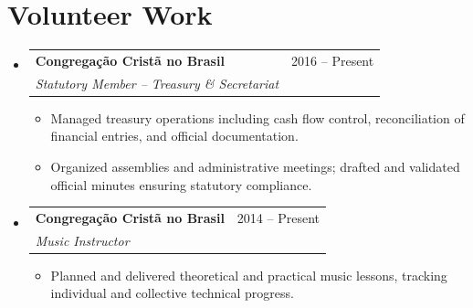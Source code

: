 \documentclass[letterpaper,11pt]{article}
\makeatletter
\newcommand{\resumeItem}[1]{
    \item\small{
            {#1 \vspace{-2pt}}
    }
}
\newcommand{\resumeSubheading}[4]{
    \vspace{-2pt}\item
    \begin{tabular*}{0.97\textwidth}[t]{l@{\extracolsep{\fill}}r}
    \textbf{#1} & #2 \\
    \textit{\small#3} & \textit{\small #4} \\
    \end{tabular*}\vspace{-7pt}
}
\newcommand{\resumeSubHeadingListStart}{\begin{itemize}[leftmargin=0.15in, label={}]}
\newcommand{\resumeSubHeadingListEnd}{\end{itemize}}
\newcommand{\resumeItemListStart}{\begin{itemize}}
\newcommand{\resumeItemListEnd}{\end{itemize}\vspace{-5pt}}
\makeatother
\begin{document}
\section{Volunteer Work}
\resumeSubHeadingListStart
\resumeSubheading
{Congregação Cristã no Brasil}{2016 -- Present}
{Statutory Member -- Treasury \& Secretariat}{}
\resumeItemListStart
    \resumeItem{Managed treasury operations including cash flow control, reconciliation of financial entries, and official documentation.}
    \resumeItem{Organized assemblies and administrative meetings; drafted and validated official minutes ensuring statutory compliance.}
\resumeItemListEnd
\resumeSubheading
{Congregação Cristã no Brasil}{2014 -- Present}
{Music Instructor}{}
\resumeItemListStart
    \resumeItem{Planned and delivered theoretical and practical music lessons, tracking individual and collective technical progress.}
\resumeItemListEnd
\resumeSubHeadingListEnd
\end{document}
